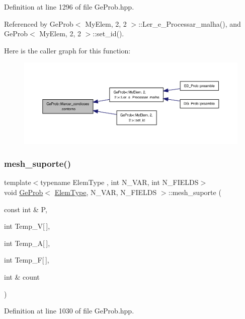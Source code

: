 Definition at line 1296 of file Ge\+Prob.\+hpp.



Referenced by Ge\+Prob$<$ My\+Elem, 2, 2 $>$\+::\+Ler\+\_\+e\+\_\+\+Processar\+\_\+malha(), and Ge\+Prob$<$ My\+Elem, 2, 2 $>$\+::set\+\_\+id().

Here is the caller graph for this function\+:
\nopagebreak
\begin{figure}[H]
\begin{center}
\leavevmode
\includegraphics[width=350pt]{classGeProb_a6fc2ba08f7556408bd9082ed34ada7bd_icgraph}
\end{center}
\end{figure}
\mbox{\label{classGeProb_ab33e0027b5ae2b712b91690b8cb75e90}} 
\subsubsection{\texorpdfstring{mesh\+\_\+suporte()}{mesh\_suporte()}}
{\footnotesize\ttfamily template$<$typename Elem\+Type , int N\+\_\+\+V\+AR, int N\+\_\+\+F\+I\+E\+L\+DS$>$ \\
void \hyperlink{classGeProb}{Ge\+Prob}$<$ \hyperlink{spectral_8h_aaa2c1a7b2d1b12c590d730fe6ac839fa}{Elem\+Type}, N\+\_\+\+V\+AR, N\+\_\+\+F\+I\+E\+L\+DS $>$\+::mesh\+\_\+suporte (\begin{DoxyParamCaption}\item[{const int \&}]{P,  }\item[{int}]{Temp\+\_\+V\mbox{[}$\,$\mbox{]},  }\item[{int}]{Temp\+\_\+A\mbox{[}$\,$\mbox{]},  }\item[{int}]{Temp\+\_\+F\mbox{[}$\,$\mbox{]},  }\item[{int \&}]{count }\end{DoxyParamCaption})}



Definition at line 1030 of file Ge\+Prob.\+hpp.



